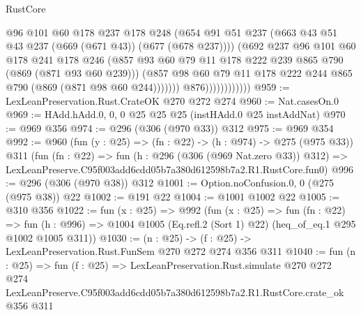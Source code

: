 \begin{lexlean}{RustCore}
\begin{coremodule}
                                  @96
                                  @101
                                  @60
                                  @178
                                  @237
                                  @178
                                  @248
                                  (@654
                                    @91
                                    @51
                                    @237
                                    (@663 @43 @51 @43 @237 (@669 (@671 @43)) (@677 (@678 @237))))
                                  (@692
                                    @237
                                    @96
                                    @101
                                    @60
                                    @178
                                    @241
                                    @178
                                    @246
                                    (@857
                                      @93
                                      @60
                                      @79
                                      @11
                                      @178
                                      @222
                                      @239
                                      @865
                                      @790
                                      (@869 (@871 @93 @60 @239)))
                                    (@857
                                      @98
                                      @60
                                      @79
                                      @11
                                      @178
                                      @222
                                      @244
                                      @865
                                      @790
                                      (@869 (@871 @98 @60 @244)))))))
                            @876))))))))))))
@959 := LexLeanPreservation.Rust.CrateOK @270 @272 @274
@960 := Nat.casesOn.{0}
@969 := HAdd.hAdd.{0, 0, 0} @25 @25 @25 (instHAdd.{0} @25 instAddNat)
@970 := @969 @356
@974 := @296 (@306 (@970 @33)) @312
@975 := @969 @354
@992 := @960
    (fun (y : @25) => (fn : @22) -> (h : @974) -> @275 (@975 @33))
    @311
    (fun (fn : @22) =>
    fun (h : @296 (@306 (@969 Nat.zero @33)) @312) =>
    LexLeanPreserve.C95f003add6cdd05b7a380d612598b7a2.R1.RustCore.fun0)
@996 := @296 (@306 (@970 @38)) @312
@1001 := Option.noConfusion.{0, 0} (@275 (@975 @38)) @22
@1002 := @191 @22
@1004 := @1001 @1002 @22
@1005 := @310 @356
@1022 := fun (x : @25) =>
  @992
    (fun (x : @25) =>
    fun (fn : @22) =>
    fun (h : @996) => @1004 @1005 (Eq.refl.{2} (Sort 1) @22) (heq_of_eq.{1} @295 @1002 @1005 @311))
@1030 := (n : @25) -> (f : @25) -> LexLeanPreservation.Rust.FunSem @270 @272 @274 @356 @311
@1040 := fun (n : @25) =>
  fun (f : @25) =>
  LexLeanPreservation.Rust.simulate
    @270
    @272
    @274
    LexLeanPreserve.C95f003add6cdd05b7a380d612598b7a2.R1.RustCore.crate_ok
    @356
    @311
\end{coremodule}
\end{lexlean}
